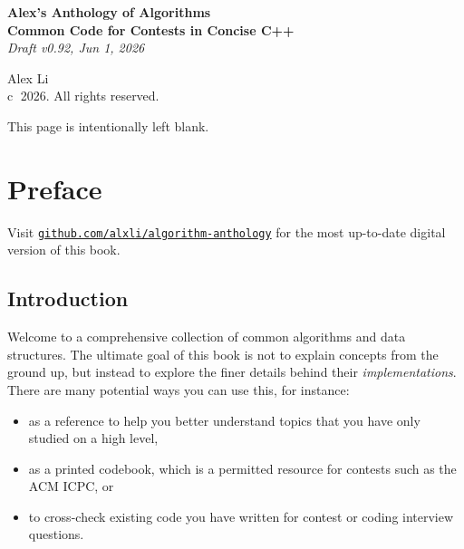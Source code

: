 \documentclass[10pt,letterpaper,twoside]{book}
\begin{document}
 
 
\frontmatter
{}

\begin{titlepage}
	\centering

	\vspace*{6 cm}

	\textbf{\LARGE Alex's Anthology of Algorithms}
	\\[1.0\baselineskip]
	\textbf{\Large Common Code for Contests in Concise C++}
	\\[1.0\baselineskip]
	{\large\textit{Draft v0.92, Jun 1, 2026}}

	\vspace*{11 cm}

	{\Large Alex Li}
	\\[0.5\baselineskip]
	{\small \textcircled{c} 2026. All rights reserved.}
\end{titlepage}

\pagebreak
\vspace*{8 cm}
\centering

{\large This page is intentionally left blank.}

\vspace{\fill}
\makeatletter

\let\cleardoublepage\clearpage
{}
\chapter{Preface}

\raggedright
\setlength{\parskip}{0.5em}

Visit \href{https://github.com/alxli/algorithm-anthology}{\texttt{github.com/alxli/algorithm-anthology}} for the most up-to-date digital version of this book.

\section*{Introduction}

Welcome to a comprehensive collection of common algorithms and data structures. The ultimate goal of this book is not to explain concepts from the ground up, but instead to explore the finer details behind their \textit{implementations}. There are many potential ways you can use this, for instance:
\begin{itemize}
	\item as a reference to help you better understand topics that you have only studied on a high level,
	\item as a printed codebook, which is a permitted resource for contests such as the ACM ICPC, or
	\item to cross-check existing code you have written for contest or coding interview questions.
\end{itemize}
\end{document}
